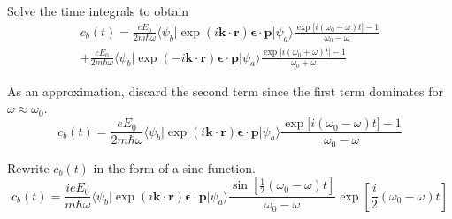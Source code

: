 Solve the time integrals to obtain
\begin{multline*}
c_b(t)=\frac{eE_0}{2m\hbar\omega}
\langle\psi_b|\exp(i\mathbf k\cdot\mathbf r)\boldsymbol{\epsilon}\cdot\mathbf p|\psi_a\rangle
\frac{\exp\bigl[i(\omega_0-\omega)t\bigr]-1}{\omega_0-\omega}
\\
+\frac{eE_0}{2m\hbar\omega}
\langle\psi_b|\exp(-i\mathbf k\cdot\mathbf r)\boldsymbol{\epsilon}\cdot\mathbf p|\psi_a\rangle
\frac{\exp\bigl[i(\omega_0+\omega)t\bigr]-1}{\omega_0+\omega}
\tag{1}
\end{multline*}

As an approximation, discard the second term since the first term
dominates for $\omega\approx\omega_0$.
\begin{equation*}
c_b(t)=\frac{eE_0}{2m\hbar\omega}
\langle\psi_b|\exp(i\mathbf k\cdot\mathbf r)\boldsymbol{\epsilon}\cdot\mathbf p|\psi_a\rangle
\frac{\exp\bigl[i(\omega_0-\omega)t\bigr]-1}{\omega_0-\omega}
\end{equation*}

Rewrite $c_b(t)$ in the form of a sine function.
\begin{equation*}
c_b(t)=\frac{ieE_0}{m\hbar\omega}
\langle\psi_b|\exp(i\mathbf k\cdot\mathbf r)\boldsymbol{\epsilon}\cdot\mathbf p|\psi_a\rangle
\frac{\sin\left[\frac{1}{2}(\omega_0-\omega)t\right]}{\omega_0-\omega}
\exp\left[\frac{i}{2}(\omega_0-\omega)t\right]
\tag{2}
\end{equation*}

